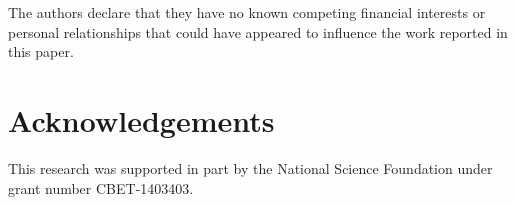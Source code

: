 \documentclass[preprint,letterpaper]{elsarticle}
\begin{document}

The authors declare that they have no known competing financial interests or personal relationships that could have appeared to influence the work reported in this paper.


\section*{Acknowledgements}

This research was supported in part by the National Science Foundation under grant number CBET-1403403.







\end{document}
